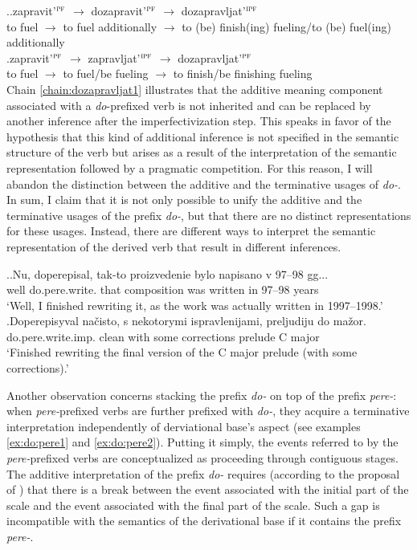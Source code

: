 \ex.\label{chain:dozapravljat}\ag.\label{chain:dozapravljat1}zapravit'$^{\textsc{pf}}$ $\rightarrow$ dozapravit'$^{\textsc{pf}}$ $\rightarrow$ dozapravljat'$^{\textsc{ipf}}$\\
{to fuel} $\rightarrow$ {to fuel additionally} $\rightarrow$ {to (be) finish(ing) fueling/to (be) fuel(ing) additionally}\\
\bg.\label{chain:dozapravljat2}zapravit'$^{\textsc{pf}}$ $\rightarrow$ zapravljat'$^{\textsc{ipf}}$ $\rightarrow$ dozapravljat'$^{\textsc{pf}}$\\
{to fuel} $\rightarrow$ {to fuel/be fueling} $\rightarrow$ {to finish/be finishing fueling}\\

Chain \ref{chain:dozapravljat1} illustrates that the additive meaning component associated with a \textit{do}-prefixed verb is not inherited and can be replaced by another inference after the imperfectivization step. This speaks in favor of the hypothesis that this kind of additional inference is not specified in the semantic structure of the verb but arises as a result of the interpretation of the semantic representation followed by a pragmatic competition. For this reason, I will abandon the distinction between the additive and the terminative usages of \textit{do-}. In sum, I claim that it is not only possible to unify the additive and the terminative usages of the prefix \textit{do-}, but that there are no distinct representations for these usages. Instead, there are different ways to interpret the semantic representation of the derived verb that result in different inferences. 

\ex.\ag.\label{ex:do:pere1}Nu, doperepisal, tak-to proizvedenie bylo napisano v 97--98 gg...\\
well do.pere.write. that composition was written in 97--98 years\\
\trans `Well, I finished rewriting it, as the work was actually written in 1997--1998.'
\bg.\label{ex:do:pere2}Doperepisyval na\v{c}isto, s nekotorymi ispravlenijami, preljudiju do ma\v{z}or.\\
do.pere.write.imp. clean with some corrections prelude C major\\
\trans `Finished rewriting the final version of the C major prelude (with some corrections).'

Another observation concerns stacking the prefix \textit{do-} on top of the prefix  \textit{pere-}: when \textit{pere-}prefixed verbs are further prefixed with \textit{do-}, they acquire a terminative interpretation independently of derviational base's aspect (see examples \ref{ex:do:pere1} and \ref{ex:do:pere2}). Putting it simply, the events referred to by the \textit{pere-}prefixed verbs are conceptualized as proceeding through contiguous stages. The additive interpretation of the prefix \textit{do-} requires (according to the proposal of \citealt{Kagan:book}) that there is a break between the event associated with the initial part of the scale and the event associated with the final part of the scale. Such a gap is incompatible with the semantics of the derivational base if it contains the prefix \textit{pere-}. 

